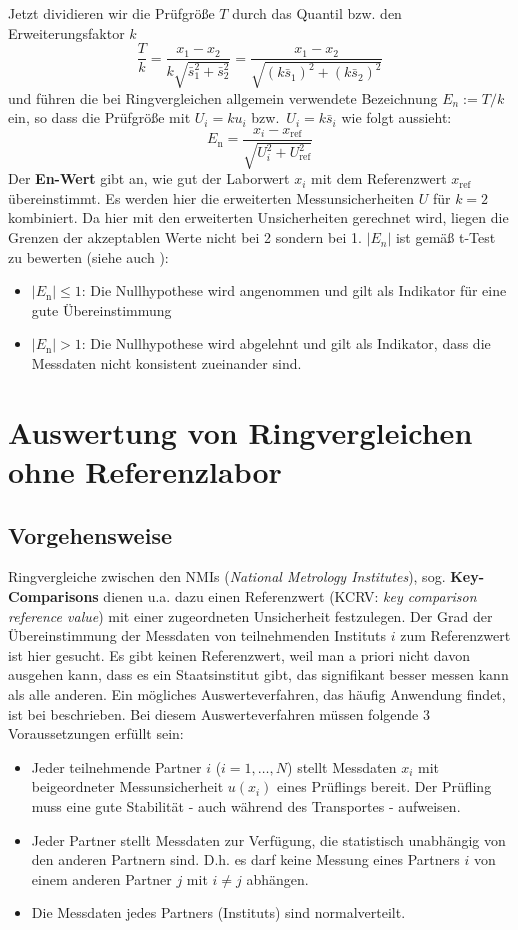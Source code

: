 Jetzt dividieren wir die Prüfgröße $T$ durch das Quantil bzw. den Erweiterungsfaktor $k$
$$
\frac{T}{k} = \frac{x_1 - x_2}{k \sqrt{\bar s_1^2 + \bar s_2^2}}  = \frac{x_1 - x_2}
{\sqrt{(k \bar s_1)^2 + (k \bar s_2)^2}}
$$
und führen die bei Ringvergleichen allgemein verwendete Bezeichnung $E_n := T /k$ ein,
so dass die Prüfgröße mit $U_i = k u_i$ bzw.\  $U_i = k \bar s_i$ wie folgt aussieht:
\begin{equation}
E_\mathrm{n} = \frac{x_{i}- x_\mathrm{ref}}{\sqrt{U_{i}^2+U_\mathrm{ref}^2}}
\label{eq:EnWert}
\end{equation}
Der \textbf{En-Wert} gibt an, wie gut der Laborwert $x_{i}$ mit dem
Referenzwert $x_\mathrm{ref}$ übereinstimmt. Es werden hier die erweiterten Messunsicherheiten $U$ für $k=2$ kombiniert.
Da hier mit den erweiterten Unsicherheiten gerechnet wird, liegen die Grenzen der akzeptablen Werte nicht bei 2 sondern bei 1.
$|E_n|$ ist gemäß t-Test zu bewerten (siehe auch \cite{ISO13528}):
\begin{itemize}
	\item $|E_\mathrm{n}| \leq 1$: Die Nullhypothese wird angenommen und gilt als Indikator für eine gute Übereinstimmung
	\item $|E_\mathrm{n}| > 1$: Die Nullhypothese wird abgelehnt und gilt als Indikator, dass die Messdaten nicht konsistent zueinander sind.
\end{itemize}

\section{Auswertung von Ringvergleichen ohne Referenzlabor}
\subsection{Vorgehensweise}
Ringvergleiche zwischen den NMIs (\textsl{National Metrology Institutes}), sog.
\textbf{Key-Com\-pari\-sons} dienen u.a. dazu einen Referenzwert (KCRV: \textsl{key comparison reference
value}) mit einer zugeordneten Unsicherheit festzulegen.
Der Grad der Übereinstimmung der Messdaten von teilnehmenden Instituts $i$ zum Referenzwert ist hier gesucht. Es gibt keinen Referenzwert, weil man a priori nicht davon ausgehen kann, dass es ein Staatsinstitut gibt, das signifikant besser messen kann als alle anderen.
Ein mögliches Auswerteverfahren, das häufig Anwendung findet, ist bei
\cite{Cox02} beschrieben. Bei diesem Auswerteverfahren müssen
folgende 3 Voraussetzungen erfüllt sein:
\begin{itemize}
	\item Jeder teilnehmende Partner $i$ ($i=1, \dots, N$) stellt Messdaten $x_i$ mit
	beigeordneter Messunsicherheit $u(x_i)$ eines Prüflings bereit. Der
	Prüfling muss eine gute Stabilität - auch während des Transportes -
	aufweisen.
	\item Jeder Partner stellt Messdaten zur Verfügung, die
	statistisch unabhängig von den anderen Partnern sind. D.h. es darf keine
	Messung eines Partners $i$ von einem anderen Partner $j$ mit $i \ne j$ abhängen.
	\item Die Messdaten jedes Partners (Instituts) sind normalverteilt.
\end{itemize}

